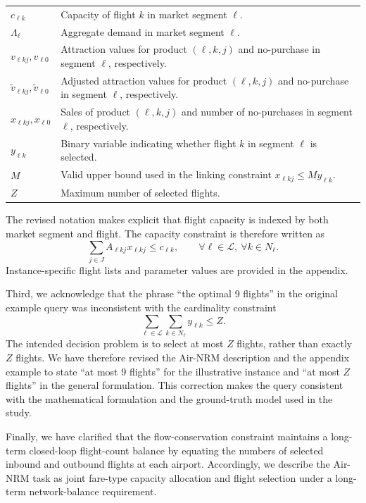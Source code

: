 \documentclass[11pt]{article}
\begin{document}
\begin{enumerate}[label=(AssoE.\arabic*),leftmargin=*]
\begin{enumerate}[label=(R1.Major.\arabic*),leftmargin=*]
\begin{table}[!htbp]
\begin{tabular}{p{} p{}}
$c_{\ell k}$
& Capacity of flight $k$ in market segment $\ell$. \\

$\Lambda_\ell$
& Aggregate demand in market segment $\ell$. \\

$v_{\ell kj}, v_{\ell0}$
& Attraction values for product $(\ell,k,j)$ and no-purchase in segment $\ell$, respectively. \\

$\widetilde{v}_{\ell kj}, \widetilde{v}_{\ell0}$
& Adjusted attraction values for product $(\ell,k,j)$ and no-purchase in segment $\ell$, respectively. \\

$x_{\ell kj}, x_{\ell0}$
& Sales of product $(\ell,k,j)$ and number of no-purchases in segment $\ell$, respectively. \\

$y_{\ell k}$
& Binary variable indicating whether flight $k$ in segment $\ell$ is selected. \\

$M$
& Valid upper bound used in the linking constraint
$x_{\ell kj}\leq M y_{\ell k}$. \\

$Z$
& Maximum number of selected flights. \\
\bottomrule
\end{tabular}
\end{table}

The revised notation makes explicit that flight capacity is indexed by both market segment and flight. The capacity constraint is therefore written as
\[
\sum_{j\in J} A_{\ell kj}x_{\ell kj}
\leq c_{\ell k},
\qquad
\forall \ell\in\mathcal{L},\ \forall k\in N_\ell.
\]
Instance-specific flight lists and parameter values are provided in the appendix.

Third, we acknowledge that the phrase ``the optimal 9 flights'' in the original example query was inconsistent with the cardinality constraint
\[
\sum_{\ell\in\mathcal{L}}
\sum_{k\in N_\ell}
y_{\ell k}
\leq Z.
\]
The intended decision problem is to select at most $Z$ flights, rather than exactly $Z$ flights. We have therefore revised the Air-NRM description and the appendix example to state ``at most 9 flights'' for the illustrative instance and ``at most $Z$ flights'' in the general formulation. This correction makes the query consistent with the mathematical formulation and the ground-truth model used in the study.

Finally, we have clarified that the flow-conservation constraint maintains a long-term closed-loop flight-count balance by equating the numbers of selected inbound and outbound flights at each airport. Accordingly, we describe the Air-NRM task as joint fare-type capacity allocation and flight selection under a long-term network-balance requirement.


\end{enumerate}
\end{enumerate}
\end{document}
